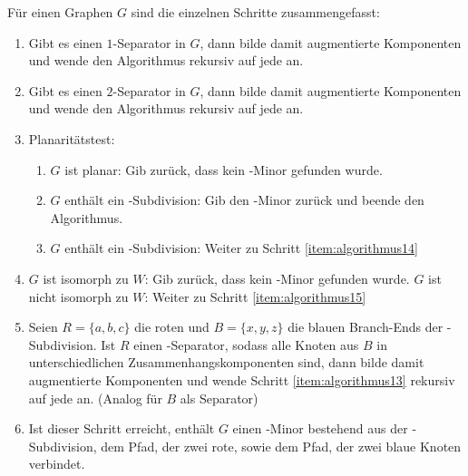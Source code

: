 \newpage
Für einen Graphen $G$ sind die einzelnen Schritte zusammengefasst:
\begin{enumerate}
  \item \label{item:algorithmus11} Gibt es einen $1$-Separator in $G$, dann bilde damit augmentierte Komponenten und wende den Algorithmus rekursiv auf jede an.
  \item \label{item:algorithmus12} Gibt es einen $2$-Separator in $G$, dann bilde damit augmentierte Komponenten und wende den Algorithmus rekursiv auf jede an.
  \item \label{item:algorithmus13} Planaritätstest:
                                   \begin{enumerate}
                                     \item $G$ ist planar: Gib zurück, dass kein \kf-Minor gefunden wurde.
                                     \item $G$ enthält ein \kf-Subdivision: Gib den \kf-Minor zurück und beende den Algorithmus.
                                     \item $G$ enthält ein \kdd-Subdivision: Weiter zu Schritt \ref{item:algorithmus14}
                                   \end{enumerate}
  \item \label{item:algorithmus14} $G$ ist isomorph zu $W$: Gib zurück, dass kein \kf-Minor gefunden wurde.
                                   $G$ ist nicht isomorph zu $W$: Weiter zu Schritt \ref{item:algorithmus15}
  \item \label{item:algorithmus15} Seien $R = \{a, b, c\}$ die roten und $B = \{x, y, z\}$ die blauen Branch-Ends der \kdd-Subdivision.
                                   Ist $R$ einen \dd-Separator, sodass alle Knoten aus $B$ in unterschiedlichen Zusammenhangskomponenten sind, dann bilde damit augmentierte Komponenten und wende Schritt \ref{item:algorithmus13} rekursiv auf jede an.
                                   (Analog für $B$ als Separator)
  \item \label{item:algorithmus16} Ist dieser Schritt erreicht, enthält $G$ einen \kf-Minor bestehend aus der \kdd-Subdivision, dem Pfad, der zwei rote, sowie dem Pfad, der zwei blaue Knoten verbindet.
\end{enumerate}

